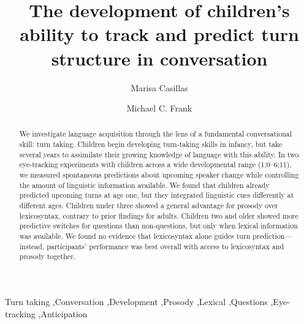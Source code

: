 \documentclass[authoryear, 12pt]{elsarticle}
\begin{document}
\begin{frontmatter}

\title{The development of children's ability to track and predict turn structure in conversation}

\author[MPI]{Marisa Casillas}
\address[MPI]{Max Planck Institute for Psycholinguistics}

\author[StanfordPSY]{Michael C. Frank}
\address[StanfordPSY]{Department of Psychology, Stanford University}

\begin{abstract}
We investigate language acquisition through the lens of a fundamental conversational skill: turn taking. Children begin developing turn-taking skills in infancy, but take several years to assimilate their growing knowledge of language with this ability. In two eye-tracking experiments with children across a wide developmental range (1;0--6;11), we measured spontaneous predictions about upcoming speaker change while controlling the amount of linguistic information available. We found that children already predicted upcoming turns at age one, but they integrated linguistic cues differently at different ages. Children under three showed a general advantage for prosody over lexicosyntax, contrary to prior findings for adults. Children two and older showed more predictive switches for questions than non-questions, but only when lexical information was available. We found no evidence that lexicosyntax alone guides turn prediction---instead, participants' performance was best overall with access to lexicosyntax and prosody together.
\end{abstract}

\begin{keyword}
Turn taking \sep Conversation \sep Development \sep Prosody \sep Lexical \sep Questions \sep Eye-tracking \sep Anticipation

\end{keyword}

\end{frontmatter}
\end{document}
